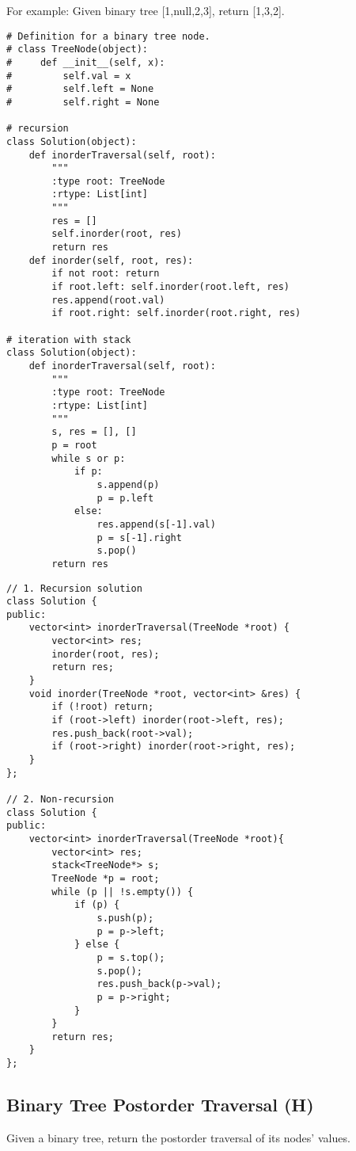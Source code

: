 For example: Given binary tree [1,null,2,3], return [1,3,2]. \\

\begin{lstlisting}
# Definition for a binary tree node.
# class TreeNode(object):
#     def __init__(self, x):
#         self.val = x
#         self.left = None
#         self.right = None

# recursion
class Solution(object):
    def inorderTraversal(self, root):
        """
        :type root: TreeNode
        :rtype: List[int]
        """
        res = []
        self.inorder(root, res)
        return res
    def inorder(self, root, res):
        if not root: return
        if root.left: self.inorder(root.left, res)
        res.append(root.val)
        if root.right: self.inorder(root.right, res)

# iteration with stack
class Solution(object):
    def inorderTraversal(self, root):
        """
        :type root: TreeNode
        :rtype: List[int]
        """
        s, res = [], []
        p = root
        while s or p:
            if p:
                s.append(p)
                p = p.left
            else:
                res.append(s[-1].val)
                p = s[-1].right
                s.pop()
        return res
\end{lstlisting}

\begin{lstlisting}
// 1. Recursion solution
class Solution {
public:
    vector<int> inorderTraversal(TreeNode *root) {
        vector<int> res;
        inorder(root, res);
        return res;
    }
    void inorder(TreeNode *root, vector<int> &res) {
        if (!root) return;
        if (root->left) inorder(root->left, res);
        res.push_back(root->val);
        if (root->right) inorder(root->right, res);
    }
};

// 2. Non-recursion
class Solution {
public:
    vector<int> inorderTraversal(TreeNode *root){
        vector<int> res;
        stack<TreeNode*> s;
        TreeNode *p = root;
        while (p || !s.empty()) {
            if (p) {
                s.push(p);
                p = p->left;
            } else {
                p = s.top();
                s.pop();
                res.push_back(p->val);
                p = p->right;
            }
        }
        return res;
    }
};
\end{lstlisting}


\subsection{Binary Tree Postorder Traversal (H)}
Given a binary tree, return the postorder traversal of its nodes' values. \\

